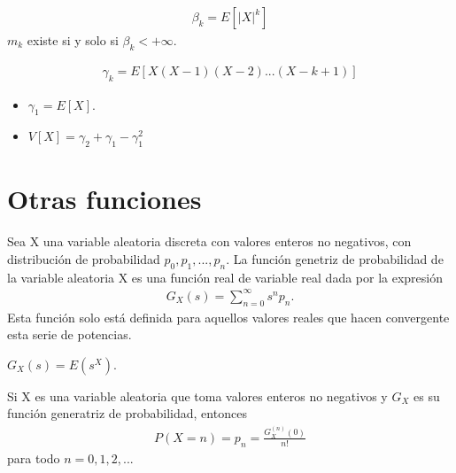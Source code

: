 \begin{defi}
    \begin{align*}
        \beta_k = E[|X|^k]
    \end{align*}
    $m_k$ existe si y solo si $\beta_k < +\infty$.
\end{defi}

\begin{defi}
    \begin{align*}
        \gamma_k = E[X(X - 1)(X - 2)...(X - k + 1)]
    \end{align*}
    \begin{itemize}
        \item $\gamma_1 = E[X]$.
        \item $V[X] = \gamma_2 + \gamma_1 - \gamma_1^2$
    \end{itemize}
\end{defi}

\section{Otras funciones}

\begin{defi}
    Sea X una variable aleatoria discreta con valores enteros no negativos, con distribución de probabilidad $p_0, p_1,...,p_n$. La función genetriz de probabilidad de la variable aleatoria X es una función real de variable real dada por la expresión
    \begin{align*}
        G_X(s) = \sum_{n=0}^{\infty}{s^np_n}.
    \end{align*}
    Esta función solo está definida para aquellos valores reales que hacen convergente esta serie de potencias.
\end{defi}

\begin{obs}
    $G_X(s) = E(s^X)$.
\end{obs}

\begin{teo}
    Si X es una variable aleatoria que toma valores enteros no negativos y $G_X$ es su función generatriz de probabilidad, entonces
    \begin{align*}
        P(X = n) = p_n = \frac{G_X^{(n)}(0)}{n!}
    \end{align*}
    para todo $n= 0, 1, 2,...$
\end{teo}

